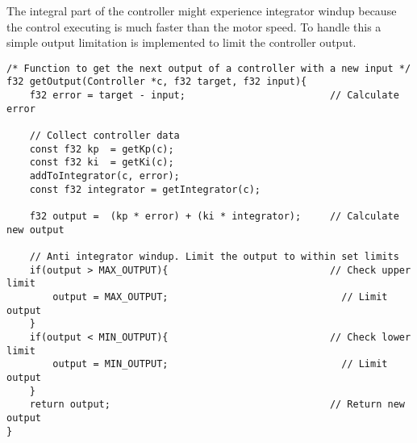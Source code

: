 The integral part of the controller might experience integrator windup because the control executing is much faster than the motor speed. To handle this a simple output limitation is implemented to limit the controller output.



\begin{lstlisting}[style=c, caption=Implementation of PI-controller 'get output'-function., label=code:pi_controller3]
/* Function to get the next output of a controller with a new input */
f32 getOutput(Controller *c, f32 target, f32 input){
	f32 error = target - input;                         // Calculate error
	
	// Collect controller data
	const f32 kp  = getKp(c);
	const f32 ki  = getKi(c);
	addToIntegrator(c, error);
	const f32 integrator = getIntegrator(c);

	f32 output =  (kp * error) + (ki * integrator);     // Calculate new output
	
	// Anti integrator windup. Limit the output to within set limits
	if(output > MAX_OUTPUT){                            // Check upper limit
		output = MAX_OUTPUT;                              // Limit output
	}
	if(output < MIN_OUTPUT){                            // Check lower limit
		output = MIN_OUTPUT;                              // Limit output
	}	
	return output;                                      // Return new output
}
\end{lstlisting}

